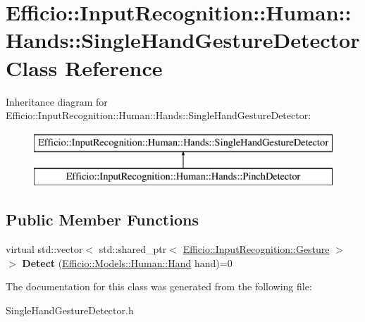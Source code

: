 \hypertarget{class_efficio_1_1_input_recognition_1_1_human_1_1_hands_1_1_single_hand_gesture_detector}{}\section{Efficio\+:\+:Input\+Recognition\+:\+:Human\+:\+:Hands\+:\+:Single\+Hand\+Gesture\+Detector Class Reference}
\label{class_efficio_1_1_input_recognition_1_1_human_1_1_hands_1_1_single_hand_gesture_detector}
Inheritance diagram for Efficio\+:\+:Input\+Recognition\+:\+:Human\+:\+:Hands\+:\+:Single\+Hand\+Gesture\+Detector\+:\begin{figure}[H]
\begin{center}
\leavevmode
\includegraphics[height=2.000000cm]{class_efficio_1_1_input_recognition_1_1_human_1_1_hands_1_1_single_hand_gesture_detector}
\end{center}
\end{figure}
\subsection*{Public Member Functions}
\begin{DoxyCompactItemize}
\item 
virtual std\+::vector$<$ std\+::shared\+\_\+ptr$<$ \hyperlink{class_efficio_1_1_input_recognition_1_1_gesture}{Efficio\+::\+Input\+Recognition\+::\+Gesture} $>$ $>$ {\bfseries Detect} (\hyperlink{class_efficio_1_1_models_1_1_human_1_1_hand}{Efficio\+::\+Models\+::\+Human\+::\+Hand} hand)=0\hypertarget{class_efficio_1_1_input_recognition_1_1_human_1_1_hands_1_1_single_hand_gesture_detector_ae5b183eb42d9d17792d73cd34b5c50c3}{}\label{class_efficio_1_1_input_recognition_1_1_human_1_1_hands_1_1_single_hand_gesture_detector_ae5b183eb42d9d17792d73cd34b5c50c3}

\end{DoxyCompactItemize}


The documentation for this class was generated from the following file\+:\begin{DoxyCompactItemize}
\item 
Single\+Hand\+Gesture\+Detector.\+h\end{DoxyCompactItemize}
